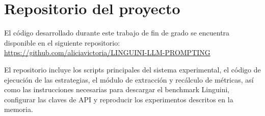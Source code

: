 
\chapter{Repositorio del proyecto}
\label{anexo:repositorio}

El código desarrollado durante este trabajo de fin de grado se encuentra disponible en el siguiente repositorio: \url{https://github.com/aliciavictoria/LINGUINI-LLM-PROMPTING}

El repositorio incluye los scripts principales del sistema experimental, el código de ejecución de las estrategias, el módulo de extracción y recálculo de métricas, así como las instrucciones necesarias para descargar el benchmark Linguini, configurar las claves de API y reproducir los experimentos descritos en la memoria.